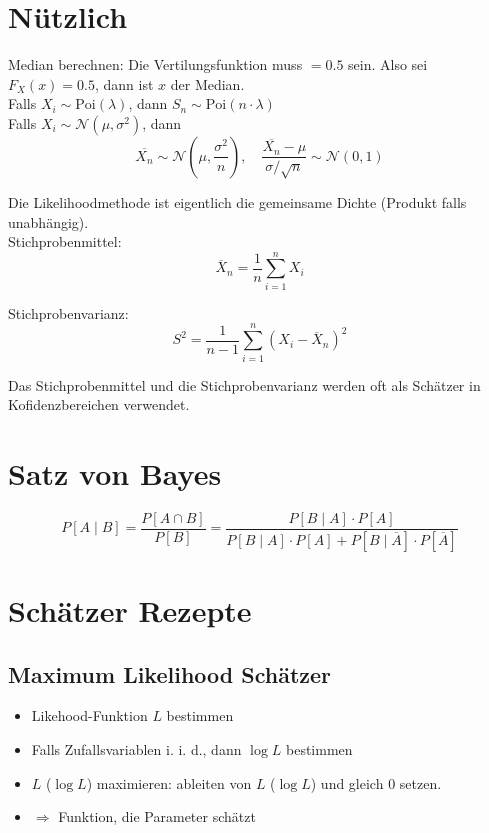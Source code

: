 \section{Nützlich}

Median berechnen: Die Vertilungsfunktion muss $= 0.5$ sein. Also sei $F_X(x) = 0.5$, dann ist $x$ der Median.\\

Falls $X_i \sim \text{Poi}(\lambda)$, dann $S_n \sim \text{Poi}(n \cdot \lambda)$
\\

Falls $X_i \sim \mathcal{N}(\mu, \sigma^2)$, dann $$\overline{X_n} \sim \mathcal{N}(\mu, \frac{\sigma^2}{n}),\quad\frac{\overline{X_n}-\mu}{\sigma / \sqrt{n}} \sim \mathcal{N}(0, 1)$$

Die Likelihoodmethode ist eigentlich die gemeinsame Dichte (Produkt falls unabhängig).\\

Stichprobenmittel: $$\overline{X}_n = \frac{1}{n	}\sum_{i=1}^nX_i$$

Stichprobenvarianz: $$S^2 = \frac{1}{n-1}\sum^n_{i=1}\left(X_i-\overline{X}_n\right)^2$$

Das Stichprobenmittel und die Stichprobenvarianz werden oft als Schätzer in Kofidenzbereichen verwendet.

\section{Satz von Bayes}

\[
	P[A\mid B] =
	\frac{P[A \cap B]}{P[B]} =
	\frac{P[B\mid A]\cdot P[A]}{P[B\mid A]\cdot P[A] + P[B \mid \overline{A}]\cdot P[\overline{A}]}
\]

\section{Schätzer Rezepte}

\subsection{Maximum Likelihood Schätzer}

\begin{itemize}
	\item Likehood-Funktion $L$ bestimmen
	\item Falls Zufallsvariablen i. i. d., dann $\log L$ bestimmen
	\item $L$ ($\log L$) maximieren: ableiten von $L$ ($\log L$) und gleich $0$ setzen.
	\item $\Rightarrow$ Funktion, die Parameter schätzt
\end{itemize}

